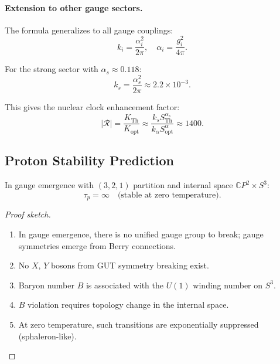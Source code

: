 \paragraph{Extension to other gauge sectors.}
The formula generalizes to all gauge couplings:
\begin{equation}
k_i = \frac{\alpha_i^2}{2\pi}, \quad \alpha_i = \frac{g_i^2}{4\pi}.
\end{equation}

For the strong sector with $\alpha_s \approx 0.118$:
\begin{equation}
k_s = \frac{\alpha_s^2}{2\pi} \approx 2.2 \times 10^{-3}.
\end{equation}

This gives the nuclear clock enhancement factor:
\begin{equation}
|\mathcal{R}| = \frac{K_{\text{Th}}}{K_{\text{opt}}} \approx \frac{k_s S_{\text{Th}}^{\alpha_s}}{k_\alpha S_{\text{opt}}^\alpha} \approx 1400.
\end{equation}

\subsection{Proton Stability Prediction}\label{app:proton-stability}

\begin{theorem}\label{thm:proton}
In gauge emergence with $(3,2,1)$ partition and internal space $\mathbb{C}P^2 \times S^3$:
\begin{equation}
\tau_p = \infty \quad \text{(stable at zero temperature)}.
\end{equation}
\end{theorem}

\begin{proof}[Proof sketch]
\begin{enumerate}
\item In gauge emergence, there is no unified gauge group to break; gauge symmetries emerge from Berry connections.
\item No $X$, $Y$ bosons from GUT symmetry breaking exist.
\item Baryon number $B$ is associated with the $U(1)$ winding number on $S^3$.
\item $B$ violation requires topology change in the internal space.
\item At zero temperature, such transitions are exponentially suppressed (sphaleron-like).
\end{enumerate}
\end{proof}

